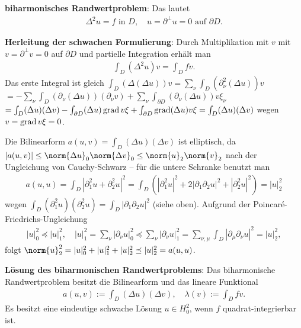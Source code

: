 \linie

\textbf{biharmonisches Randwertproblem}:
Das  lautet
\begin{align*}
    \Delta^2 u = f \text{ in } D,\quad
    u = \partial^\perp u = 0 \text{ auf } \partial D.
\end{align*}

\linie

\textbf{Herleitung der schwachen Formulierung}:
Durch Multiplikation mit $v$ mit $v = \partial^\perp v = 0$ auf $\partial D$ und
partielle Integration erhält man
\begin{align*}
    \int_D (\Delta^2 u) v = \int_D fv.
\end{align*}
Das erste Integral ist gleich $\int_D (\Delta (\Delta u)) v =
\sum_\nu \int_D (\partial_\nu^2 (\Delta u)) v$\\
$= -\sum_\nu \int_D (\partial_\nu (\Delta u)) (\partial_\nu v) +
\sum_\nu \int_{\partial D} (\partial_\nu (\Delta u)) v \xi_\nu$\\
$= \int_D (\Delta u) (\Delta v) -
\int_{\partial D} (\Delta u) \operatorname{grad} v \xi +
\int_{\partial D} \operatorname{grad}(\Delta u) v \xi = \int_D (\Delta u) (\Delta v)$
wegen $v = \operatorname{grad} v \xi = 0$.

Die Bilinearform $a(u, v) = \int_D (\Delta u) (\Delta v)$ ist elliptisch, da
$|a(u, v)| \le \norm{\Delta u}_0 \norm{\Delta v}_0 \le \norm{u}_2 \norm{v}_2$
nach der Ungleichung von Cauchy-Schwarz --
für die untere Schranke benutzt man
\begin{align*}
    a(u, u) = \int_D |\partial_1^2 u + \partial_2^2 u|^2
    = \int_D \left(|\partial_1^2 u|^2 + 2|\partial_1 \partial_2 u|^2 + |\partial_2^2 u|^2\right)
    = |u|_2^2
\end{align*}
wegen $\int_D (\partial_1^2 u)(\partial_2^2 u) = \int_D |\partial_1 \partial_2 u|^2$ (siehe oben).
Aufgrund der Poincaré-Friedrichs-Ungleichung
\begin{align*}
    |u|_0^2 \preceq |u|_1^2,\quad
    |u|_1^2 = \sum_\nu |\partial_\nu u|_0^2 \preceq \sum_\nu |\partial_\nu u|_1^2
    = \sum_{\nu,\mu} \int_D |\partial_\mu \partial_\nu u|^2 = |u|_2^2,
\end{align*}
folgt $\norm{u}_2^2 = |u|_0^2 + |u|_1^2 + |u|_2^2 \preceq |u|_2^2 = a(u, u)$.

\linie

\textbf{Lösung des biharmonischen Randwertproblems}:
Das biharmonische Randwertproblem besitzt die Bilinearform und das lineare Funktional
\begin{align*}
    a(u, v) := \int_D (\Delta u) (\Delta v),\quad
    \lambda(v) := \int_D fv.
\end{align*}
Es besitzt eine eindeutige schwache Lösung $u \in H_0^2$, wenn $f$ quadrat-integrierbar ist.

